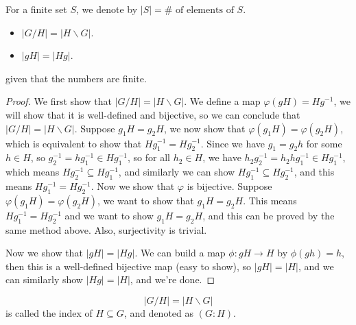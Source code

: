 \begin{remark}
    For a finite set \(S\), we denote by \(\vert S \vert = \# \text{ of elements of } S\).  
\end{remark}

\begin{theorem}
    \vphantom{text}
    \begin{itemize}
        \item \(\left\vert G / H \right\vert = \left\vert H \backslash G \right\vert  \). 
        \item \(\left\vert gH \right\vert = \left\vert Hg \right\vert  \).  
    \end{itemize}
    given that the numbers are finite.
\end{theorem}
\begin{proof}
    We first show that \(\left\vert G / H \right\vert = \left\vert H \backslash G \right\vert  \). We define a map \(\varphi (gH) = Hg^{-1} \), we will show that it is well-defined and bijective, so we can conclude that \(\left\vert G / H \right\vert = \left\vert H \backslash G \right\vert  \). Suppose \(g_1 H = g_2 H\), we now show that \(\varphi \left( g_1 H \right) = \varphi \left( g_2 H \right)  \), which is equivalent to show that \(Hg_1^{-1} = Hg_2^{-1} \). Since we have \(g_1 = g_2 h\) for some \(h \in H\), so \(g_2^{-1} = h g_1^{-1}  \in H g_1^{-1} \), so for all \(h_2 \in H\), we have \(h_2 g_2^{-1} = h_2 h g_1^{-1} \in H g_1^{-1} \), which means \(H g_2^{-1} \subseteq H g_1^{-1}\), and similarly we can show \(H g_1^{-1} \subseteq H g_2^{-1}\), and this means \(H g_1^{-1} = H g_2^{-1}\). Now we show that \(\varphi \) is bijective. Suppose \(\varphi (g_1 H) = \varphi (g_2 H)\), we want to show that \(g_1 H = g_2 H\). This means \(H g_1^{-1} = H g_2^{-1}\) and we want to show \(g_1 H = g_2 H\), and this can be proved by the same method above. Also, surjectivity is trivial. 
    
    Now we show that \(\left\vert g H \right\vert = \left\vert H g \right\vert \). We can build a map \(\phi : gH \to H\) by \(\phi (gh) = h\), then this is a well-defined bijective map (easy to show), so \(\left\vert g H \right\vert = \vert H \vert  \), and we can similarly show \(\left\vert Hg \right\vert = \vert H \vert  \), and we're done.   
\end{proof}

\begin{notation}
    \[
        \left\vert G / H \right\vert = \left\vert H \backslash G \right\vert  
    \] is called the index of \(H \subseteq G\), and denoted as \((G:H)\).   
\end{notation}

